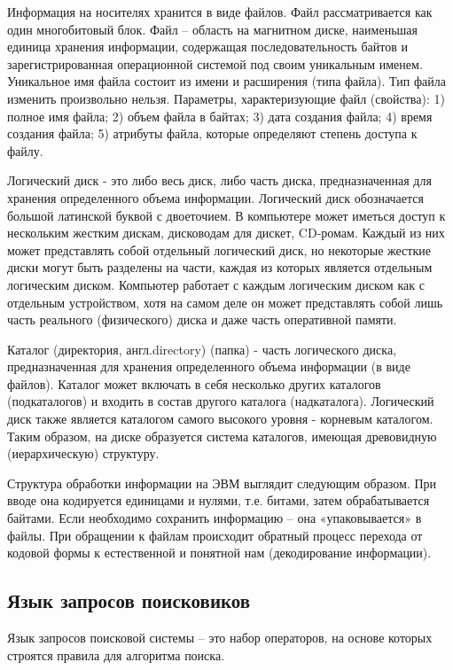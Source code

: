\documentclass[a4paper]{article}
\begin{document}
Информация на носителях хранится в виде файлов. Файл рассматривается как один многобитовый блок. Файл – область на магнитном диске, наименьшая единица хранения информации, содержащая последовательность байтов и зарегистрированная операционной системой под своим уникальным именем. Уникальное имя файла состоит из имени и расширения (типа файла). Тип файла изменить произвольно нельзя. Параметры, характеризующие файл (свойства): 1) полное имя файла; 2) объем файла в байтах; 3) дата создания файла; 4) время создания файла; 5) атрибуты файла, которые определяют степень доступа к файлу.

Логический диск - это либо весь диск, либо часть диска, предназначенная для хранения определенного объема информации. Логический диск обозначается большой латинской буквой с двоеточием. В компьютере может иметься доступ к нескольким жестким дискам, дисководам для дискет, CD-ромам. Каждый из них может представлять собой отдельный логический диск, но некоторые жесткие диски могут быть разделены на части, каждая из которых является отдельным логическим диском. Компьютер работает с каждым логическим диском как с отдельным устройством, хотя на самом деле он может представлять собой лишь часть реального (физического) диска и даже часть оперативной памяти.

Каталог (директория, англ.directory) (папка) - часть логического диска, предназначенная для хранения определенного объема информации (в виде файлов). Каталог может включать в себя несколько других каталогов (подкаталогов) и входить в состав другого каталога (надкаталога). Логический диск также является каталогом самого высокого уровня - корневым каталогом. Таким образом, на диске образуется система каталогов, имеющая древовидную (иерархическую) структуру.

Структура обработки информации на ЭВМ выглядит следующим образом. При вводе она кодируется единицами и нулями, т.е. битами, затем обрабатывается байтами. Если необходимо сохранить информацию – она «упаковывается» в файлы. При обращении к файлам происходит обратный процесс перехода от кодовой формы к естественной и понятной нам (декодирование информации).

\subsection{Язык запросов поисковиков}

Язык запросов поисковой системы – это набор операторов, на основе которых строятся правила для алгоритма поиска.
\end{document}

